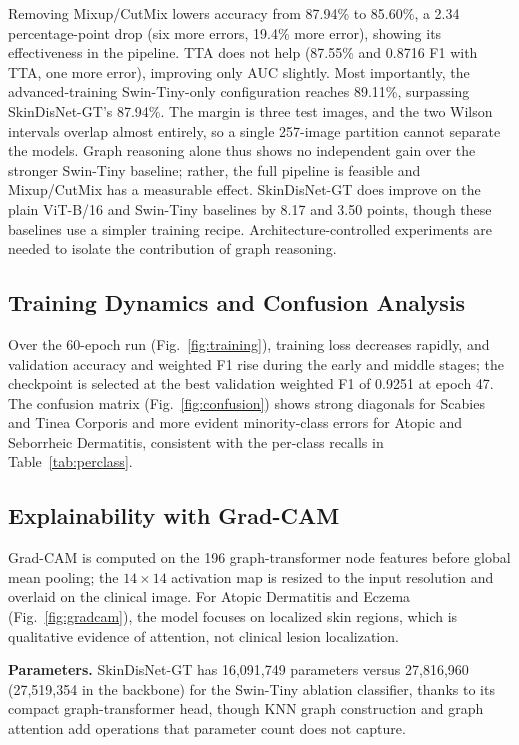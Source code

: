 \documentclass[conference]{IEEEtran}
\begin{document}
Removing Mixup/CutMix lowers accuracy from 87.94\% to 85.60\%, a 2.34 percentage-point drop (six more errors, 19.4\% more error), showing its effectiveness in the pipeline. TTA does not help (87.55\% and 0.8716 F1 with TTA, one more error), improving only AUC slightly. Most importantly, the advanced-training Swin-Tiny-only configuration reaches 89.11\%, surpassing SkinDisNet-GT's 87.94\%. The margin is three test images, and the two Wilson intervals overlap almost entirely, so a single 257-image partition cannot separate the models. Graph reasoning alone thus shows no independent gain over the stronger Swin-Tiny baseline; rather, the full pipeline is feasible and Mixup/CutMix has a measurable effect. SkinDisNet-GT does improve on the plain ViT-B/16 and Swin-Tiny baselines by 8.17 and 3.50 points, though these baselines use a simpler training recipe. Architecture-controlled experiments are needed to isolate the contribution of graph reasoning.

\subsection{Training Dynamics and Confusion Analysis}
Over the 60-epoch run (Fig.~\ref{fig:training}), training loss decreases rapidly, and validation accuracy and weighted F1 rise during the early and middle stages; the checkpoint is selected at the best validation weighted F1 of 0.9251 at epoch 47. The confusion matrix (Fig.~\ref{fig:confusion}) shows strong diagonals for Scabies and Tinea Corporis and more evident minority-class errors for Atopic and Seborrheic Dermatitis, consistent with the per-class recalls in Table~\ref{tab:perclass}.



\subsection{Explainability with Grad-CAM}
Grad-CAM is computed on the 196 graph-transformer node features before global mean pooling; the $14\times14$ activation map is resized to the input resolution and overlaid on the clinical image. For Atopic Dermatitis and Eczema (Fig.~\ref{fig:gradcam}), the model focuses on localized skin regions, which is qualitative evidence of attention, not clinical lesion localization.


\textbf{Parameters.} SkinDisNet-GT has 16,091,749 parameters versus 27,816,960 (27,519,354 in the backbone) for the Swin-Tiny ablation classifier, thanks to its compact graph-transformer head, though KNN graph construction and graph attention add operations that parameter count does not capture.
\end{document}
